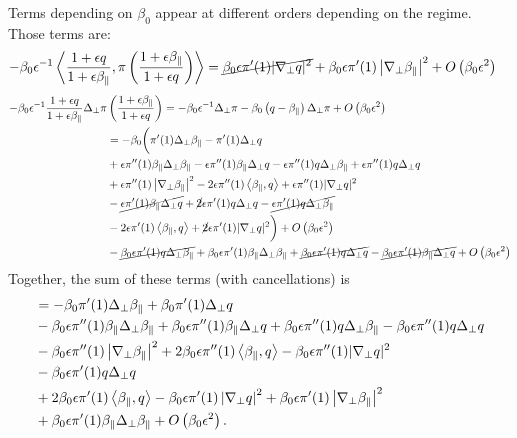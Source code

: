 \documentclass{article}
\newcommand{\para}{\parallel}
\newcommand{\ep}{\epsilon}
\newcommand{\np}{\nabla_\perp}
\newcommand{\lap}{\Delta_\perp}
\newcommand{\fr}{\frac{1+\ep q}{1+\ep\beta_\para}}
\newcommand{\frinv}{\frac{1+\ep\beta_\para}{1+\ep q}}
\newcommand{\pth} [1] {\left( #1 \right) }
\begin{document}
Terms depending on $\beta_0$ appear at different orders depending on the regime. Those terms are: 
\begin{align*}
    -\beta_0\ep^{-1}\Braket{\fr, \pi\pth{\frinv}} &= \cancel{\beta_0\ep\pi'(1)|\np q|^2} + \beta_0\ep\pi'(1)\left|\np\beta_\para\right|^2 + O\pth{\beta_0\ep^2} 
\end{align*}
\begin{align*}
    - \beta_0\ep^{-1} \fr\lap\pi&\pth{\frinv} = -\beta_0\ep^{-1} \lap\pi - \beta_0\pth{q-\beta_\para} \lap\pi + O\pth{\beta_0\ep^2} \\ 
        &= -\beta_0 \biggl( \pi'(1) \lap\beta_\para - \pi'(1) \lap q \biggr. \\ 
    &+ \ep\pi''(1) \beta_\para\lap \beta_\para - \ep\pi''(1) \beta_\para\lap q - \ep\pi''(1) q\lap\beta_\para + \ep\pi''(1) q\lap q \\ 
    &+ \ep\pi''(1) \left|\np\beta_\para\right|^2 - 2\ep\pi''(1) \Braket{\beta_\para,q} + \ep\pi''(1) |\np q|^2 \\ 
    &- \cancel{\ep\pi'(1) \beta_\para\lap q} + \cancel{2}\ep\pi'(1) q\lap q - \cancel{\ep\pi'(1) q\lap\beta_\para} \\ 
    &- \biggl. 2\ep\pi'(1) \Braket{\beta_\para,q} + \cancel{2}\ep\pi'(1) |\np q|^2 \biggr) + O\pth{\beta_0\ep^2} \\ 
    &- \cancel{\beta_0\ep\pi'(1) q\lap\beta_\para} + \beta_0\ep\pi'(1) \beta_\para\lap\beta_\para + \cancel{\beta_0\ep\pi'(1) q\lap q} - \cancel{\beta_0\ep\pi'(1) \beta_\para\lap q} + O\pth{\beta_0\ep^2} 
\end{align*}
Together, the sum of these terms (with cancellations) is 
\begin{align*}
        &= -\beta_0\pi'(1) \lap\beta_\para + \beta_0\pi'(1) \lap q \\ 
    &- \beta_0\ep\pi''(1) \beta_\para\lap \beta_\para + \beta_0\ep\pi''(1) \beta_\para\lap q + \beta_0\ep\pi''(1) q\lap\beta_\para - \beta_0\ep\pi''(1) q\lap q \\ 
    &- \beta_0\ep\pi''(1) \left|\np\beta_\para\right|^2 + 2\beta_0\ep\pi''(1) \Braket{\beta_\para,q} - \beta_0\ep\pi''(1) |\np q|^2 \\ 
    &- \beta_0\ep\pi'(1) q\lap q \\ 
    &+ 2\beta_0\ep\pi'(1) \Braket{\beta_\para,q} - \beta_0\ep\pi'(1) \left|\np q\right|^2 + \beta_0\ep\pi'(1) \left|\np\beta_\para\right|^2 \\ 
    &+ \beta_0\ep\pi'(1) \beta_\para\lap\beta_\para + O\pth{\beta_0\ep^2}. 
\end{align*}
\end{document}
